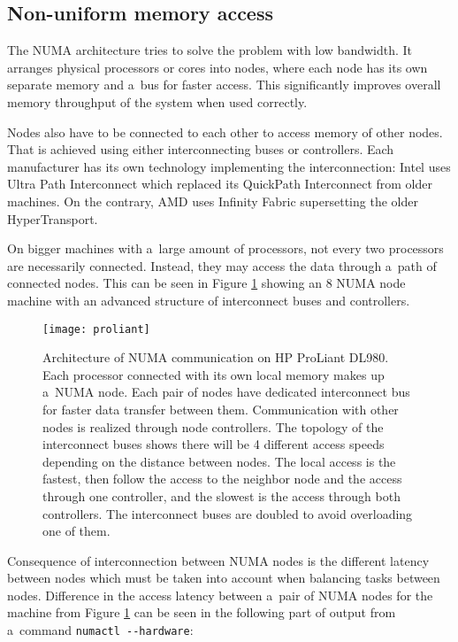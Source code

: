 \subsection{Non-uniform memory access}
The NUMA architecture tries to solve the problem with low bandwidth.
It arranges physical processors or cores into nodes, where each node has its
own separate memory and a~bus for faster access. This significantly improves
overall memory throughput of the system when used correctly.

Nodes also have to be connected to each other to access memory of other
nodes. That is achieved using either interconnecting buses or controllers. Each
manufacturer has its own technology implementing the interconnection: Intel uses
Ultra Path Interconnect which replaced its QuickPath Interconnect from older
machines. On the contrary, AMD uses Infinity Fabric supersetting the older
HyperTransport.

On bigger machines with a~large amount of processors, not every two processors
are necessarily connected. Instead, they may access the data through a~path
of connected nodes. This can be seen in Figure \ref{fig:proliant} showing an 8
NUMA node machine with an advanced structure of interconnect buses and
controllers.

\begin{figure}
  \centering
  \texttt{[image: proliant]}
  \caption{Architecture of NUMA communication on HP ProLiant
    DL980\;\cite{proliant}. Each processor connected with its own local memory
    makes up a~NUMA node. Each pair of nodes have dedicated interconnect bus for
    faster data transfer between them. Communication with other nodes is
    realized through node controllers. The topology of the interconnect buses
    shows there will be 4 different access speeds depending on the distance
    between nodes. The local access is the fastest, then follow the access to
    the neighbor node and the access through one controller, and the slowest is the
    access through both controllers. The interconnect buses are doubled to avoid
    overloading one of them.}
  \label{fig:proliant}
\end{figure}

Consequence of interconnection between NUMA nodes is the different latency
between nodes which must be taken into account when balancing tasks between
nodes. Difference in the access latency between a~pair of NUMA nodes for the
machine from Figure \ref{fig:proliant} can be seen in the following part of
output from a~command \verb|numactl --hardware|:

